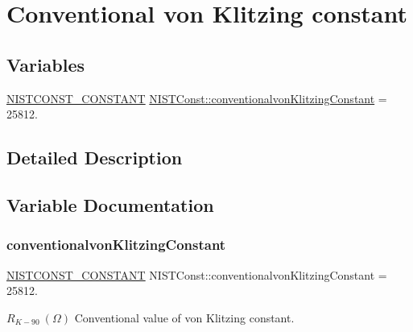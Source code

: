 \hypertarget{group___n_i_s_t_const-_conventionalvon_klitzing_constant}{}\section{Conventional von Klitzing constant}
\label{group___n_i_s_t_const-_conventionalvon_klitzing_constant}
\subsection*{Variables}
\begin{DoxyCompactItemize}
\item 
\mbox{\hyperlink{group___n_i_s_t_const-_macros_ga2b0fc1d7452373f816175dd86ce26729}{N\+I\+S\+T\+C\+O\+N\+S\+T\+\_\+\+C\+O\+N\+S\+T\+A\+NT}} \mbox{\hyperlink{group___n_i_s_t_const-_conventionalvon_klitzing_constant_ga939418415f337c3a3a375d946199cfb0}{N\+I\+S\+T\+Const\+::conventionalvon\+Klitzing\+Constant}} = 25812.
\end{DoxyCompactItemize}


\subsection{Detailed Description}


\subsection{Variable Documentation}
\mbox{\label{group___n_i_s_t_const-_conventionalvon_klitzing_constant_ga939418415f337c3a3a375d946199cfb0}} 
\subsubsection{\texorpdfstring{conventionalvon\+Klitzing\+Constant}{conventionalvonKlitzingConstant}}
{\footnotesize\ttfamily \mbox{\hyperlink{group___n_i_s_t_const-_macros_ga2b0fc1d7452373f816175dd86ce26729}{N\+I\+S\+T\+C\+O\+N\+S\+T\+\_\+\+C\+O\+N\+S\+T\+A\+NT}} N\+I\+S\+T\+Const\+::conventionalvon\+Klitzing\+Constant = 25812.}

$R_{K-90} \ (\Omega)$ Conventional value of von Klitzing constant. 